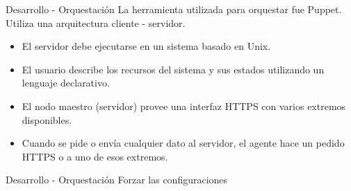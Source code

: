 
\begin{frame}{Desarrollo - Orquestación}
    \vspace{-1.5cm}
    La herramienta utilizada para orquestar fue Puppet.
    \\
    Utiliza una arquitectura cliente - servidor.  
    \begin{itemize}
        \item El servidor debe ejecutarse en un sistema basado en Unix.
        \item El usuario describe los recursos del sistema y sus estados utilizando un lenguaje declarativo.    
        \item El nodo maestro (servidor) provee una interfaz HTTPS con varios extremos disponibles.
        \item Cuando se pide o envía cualquier dato al servidor, el agente hace un pedido HTTPS o a uno de esos extremos. 
    \end{itemize}

\end{frame}


\begin{frame}{Desarrollo - Orquestación}
    \vspace{0cm} {Forzar las configuraciones}
    \vspace{0cm}
        \begin{figure}[ht]
           \centering
        \end{figure}

\end{frame}


